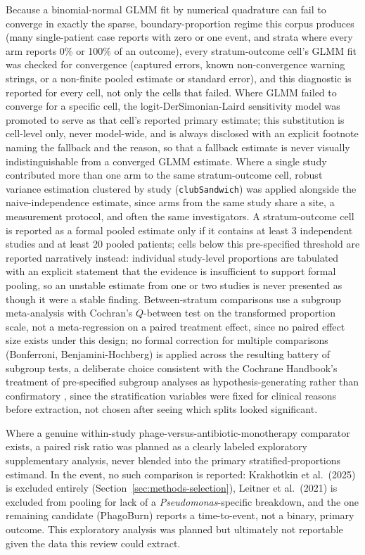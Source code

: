 Because a binomial-normal GLMM fit by numerical quadrature can fail to converge in exactly the sparse, boundary-proportion regime this corpus produces (many single-patient case reports with zero or one event, and strata where every arm reports 0\% or 100\% of an outcome), every stratum-outcome cell's GLMM fit was checked for convergence (captured errors, known non-convergence warning strings, or a non-finite pooled estimate or standard error), and this diagnostic is reported for every cell, not only the cells that failed. Where GLMM failed to converge for a specific cell, the logit-DerSimonian-Laird sensitivity model was promoted to serve as that cell's reported primary estimate; this substitution is cell-level only, never model-wide, and is always disclosed with an explicit footnote naming the fallback and the reason, so that a fallback estimate is never visually indistinguishable from a converged GLMM estimate. Where a single study contributed more than one arm to the same stratum-outcome cell, robust variance estimation clustered by study (\texttt{clubSandwich}) was applied alongside the naive-independence estimate, since arms from the same study share a site, a measurement protocol, and often the same investigators. A stratum-outcome cell is reported as a formal pooled estimate only if it contains at least 3 independent studies and at least 20 pooled patients; cells below this pre-specified threshold are reported narratively instead: individual study-level proportions are tabulated with an explicit statement that the evidence is insufficient to support formal pooling, so an unstable estimate from one or two studies is never presented as though it were a stable finding. Between-stratum comparisons use a subgroup meta-analysis with Cochran's $Q$-between test on the transformed proportion scale, not a meta-regression on a paired treatment effect, since no paired effect size exists under this design; no formal correction for multiple comparisons (Bonferroni, Benjamini-Hochberg) is applied across the resulting battery of subgroup tests, a deliberate choice consistent with the Cochrane Handbook's treatment of pre-specified subgroup analyses as hypothesis-generating rather than confirmatory \parencite{Higgins2023_cochranehandbook}, since the stratification variables were fixed for clinical reasons before extraction, not chosen after seeing which splits looked significant.

Where a genuine within-study phage-versus-antibiotic-monotherapy comparator exists, a paired risk ratio was planned as a clearly labeled exploratory supplementary analysis, never blended into the primary stratified-proportions estimand. In the event, no such comparison is reported: Krakhotkin et al.\ (2025) is excluded entirely (Section~\ref{sec:methods-selection}), Leitner et al.\ (2021) is excluded from pooling for lack of a \textit{Pseudomonas}-specific breakdown, and the one remaining candidate (PhagoBurn) reports a time-to-event, not a binary, primary outcome. This exploratory analysis was planned but ultimately not reportable given the data this review could extract.

